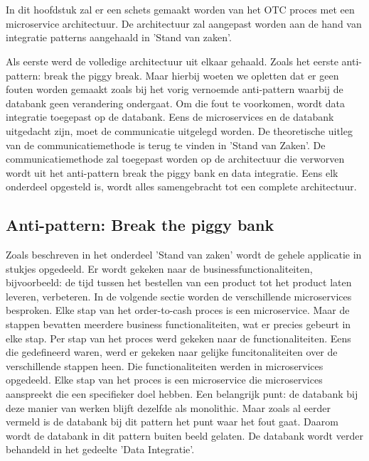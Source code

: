 
\chapter{}
\label{ch:methodologie}

In dit hoofdstuk zal er een schets gemaakt worden van het OTC proces met een microservice architectuur. De architectuur zal aangepast worden aan de hand van integratie patterns aangehaald in 'Stand van zaken'. 

Als eerste werd de volledige architectuur uit elkaar gehaald. Zoals het eerste anti-pattern: break the piggy break. Maar hierbij woeten we opletten dat er geen fouten worden gemaakt zoals bij het vorig vernoemde anti-pattern waarbij de databank geen verandering ondergaat. Om die fout te voorkomen, wordt data integratie toegepast op de databank. Eens de microservices en de databank uitgedacht zijn, moet de communicatie uitgelegd worden. De theoretische uitleg van de communicatiemethode is terug te vinden in 'Stand van Zaken'. De communicatiemethode zal toegepast worden op de architectuur die verworven wordt uit het anti-pattern break the piggy bank en data integratie.
Eens elk onderdeel opgesteld is, wordt alles samengebracht tot een complete architectuur.

\section{Anti-pattern: Break the piggy bank}
Zoals beschreven in het onderdeel 'Stand van zaken' wordt de gehele applicatie in stukjes opgedeeld. Er wordt gekeken naar de businessfunctionaliteiten, bijvoorbeeld: de tijd tussen het bestellen van een product tot het product laten leveren, verbeteren. 
In de volgende sectie worden de verschillende microservices besproken. Elke stap van het order-to-cash proces is een microservice. Maar de stappen bevatten meerdere business functionaliteiten, wat er precies gebeurt in elke stap. Per stap van het proces werd gekeken naar de functionaliteiten. Eens die gedefineerd waren, werd er gekeken naar gelijke funcitonaliteiten over de verschillende stappen heen. Die functionaliteiten werden in microservices opgedeeld. 
Elke stap van het proces is een microservice die microservices aanspreekt die een specifieker doel hebben. Een belangrijk punt: de databank bij deze manier van werken blijft dezelfde als monolithic. Maar zoals al eerder vermeld is de databank bij dit pattern het punt waar het fout gaat. Daarom wordt de databank in dit pattern buiten beeld gelaten. De databank wordt verder behandeld in het gedeelte 'Data Integratie'.

